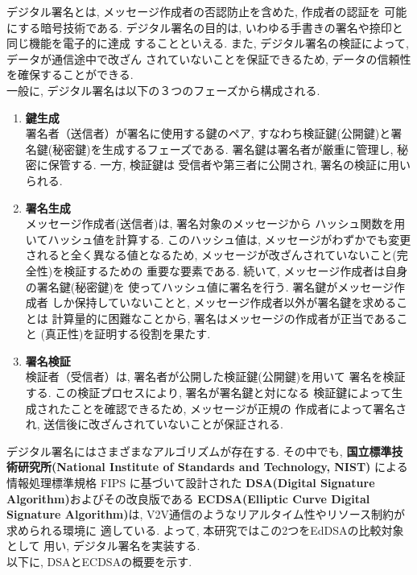 デジタル署名とは, メッセージ作成者の否認防止を含めた, 作成者の認証を
可能にする暗号技術である. 
デジタル署名の目的は, いわゆる手書きの署名や捺印と同じ機能を電子的に達成
することといえる. また, デジタル署名の検証によって, データが通信途中で改ざん
されていないことを保証できるため, データの信頼性を確保することができる.\\
\indent 一般に, デジタル署名は以下の３つのフェーズから構成される.

\begin{enumerate}
  \item \textbf{鍵生成}\\
  \indent 署名者（送信者）が署名に使用する鍵のペア, 
  すなわち検証鍵(公開鍵)と署名鍵(秘密鍵)を生成するフェーズである. 
  署名鍵は署名者が厳重に管理し, 秘密に保管する. 一方, 検証鍵は
  受信者や第三者に公開され, 署名の検証に用いられる.
  \item \textbf{署名生成}\\
  \indent メッセージ作成者(送信者)は, 署名対象のメッセージから
  ハッシュ関数を用いてハッシュ値を計算する. このハッシュ値は, 
  メッセージがわずかでも変更されると全く異なる値となるため, 
  メッセージが改ざんされていないこと(完全性)を検証するための
  重要な要素である. 続いて, メッセージ作成者は自身の署名鍵(秘密鍵)を
  使ってハッシュ値に署名を行う. 署名鍵がメッセージ作成者
  しか保持していないことと, メッセージ作成者以外が署名鍵を求めることは
  計算量的に困難なことから, 署名はメッセージの作成者が正当であること
  (真正性)を証明する役割を果たす. 
  \item \textbf{署名検証}\\
  \indent 検証者（受信者）は, 署名者が公開した検証鍵(公開鍵)を用いて
  署名を検証する. この検証プロセスにより, 署名が署名鍵と対になる
  検証鍵によって生成されたことを確認できるため, メッセージが正規の
  作成者によって署名され, 送信後に改ざんされていないことが保証される.
\end{enumerate}

デジタル署名にはさまざまなアルゴリズムが存在する. その中でも,    
\textbf{国立標準技術研究所(National Institute of Standards and Technology, NIST)}
による情報処理標準規格 FIPS に基づいて設計された
\textbf{DSA(Digital Signature Algorithm)}およびその改良版である
\textbf{ECDSA(Elliptic Curve Digital Signature Algorithm)}は, 
V2V通信のようなリアルタイム性やリソース制約が求められる環境に
適している. よって, 本研究ではこの2つをEdDSAの比較対象として
用い, デジタル署名を実装する.\\
以下に, DSAとECDSAの概要を示す. \\[1em] 


\\

\\
